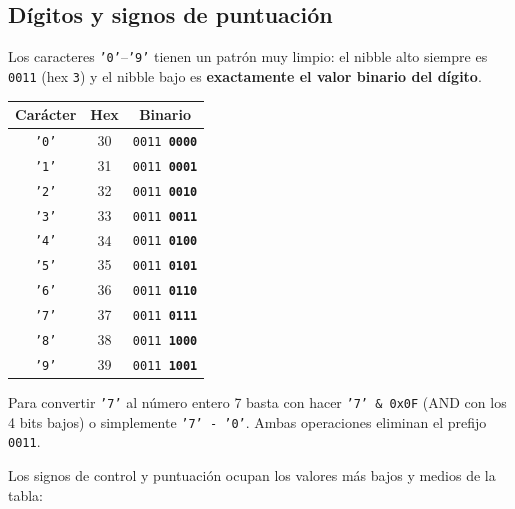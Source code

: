 \documentclass[12pt, oneside]{article}
\begin{document}
\subsection{Dígitos y signos de puntuación}

Los caracteres \texttt{'0'}–\texttt{'9'} tienen un patrón muy limpio:
el nibble alto siempre es \texttt{0011} (hex \texttt{3}) y el nibble bajo
es \textbf{exactamente el valor binario del dígito}.

\begin{center}
\begin{tabular}{ccc}
  \toprule
  \textbf{Carácter} & \textbf{Hex} & \textbf{Binario} \\
  \midrule
  \texttt{'0'} & 30 & \texttt{0011 \textbf{0000}} \\
  \texttt{'1'} & 31 & \texttt{0011 \textbf{0001}} \\
  \texttt{'2'} & 32 & \texttt{0011 \textbf{0010}} \\
  \texttt{'3'} & 33 & \texttt{0011 \textbf{0011}} \\
  \texttt{'4'} & 34 & \texttt{0011 \textbf{0100}} \\
  \texttt{'5'} & 35 & \texttt{0011 \textbf{0101}} \\
  \texttt{'6'} & 36 & \texttt{0011 \textbf{0110}} \\
  \texttt{'7'} & 37 & \texttt{0011 \textbf{0111}} \\
  \texttt{'8'} & 38 & \texttt{0011 \textbf{1000}} \\
  \texttt{'9'} & 39 & \texttt{0011 \textbf{1001}} \\
  \bottomrule
\end{tabular}
\end{center}

\begin{consejo}
  Para convertir \texttt{'7'} al número entero 7 basta con hacer
  \texttt{'7' \& 0x0F} (AND con los 4 bits bajos) o simplemente
  \texttt{'7' - '0'}. Ambas operaciones eliminan el prefijo \texttt{0011}.
\end{consejo}

Los signos de control y puntuación ocupan los valores más bajos y
medios de la tabla:
\end{document}

